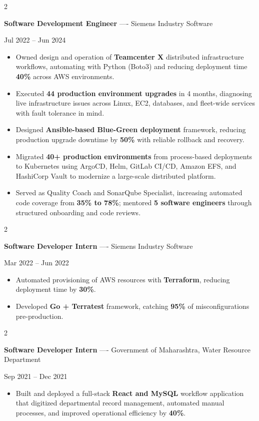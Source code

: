 \documentclass[10pt, letterpaper]{article}
\newenvironment{highlights}{
    \begin{itemize}[
        topsep=0.10 cm,
        parsep=0.06 cm,
        partopsep=0pt,
        itemsep=0.06 cm,
        leftmargin=12pt
    ]
}{
    \end{itemize}
}
\newenvironment{twocolentry}[2][]{
    \onecolentry
    \def\secondColumn{#2}
    \setcolumnwidth{\fill, 4.5 cm}
    \begin{paracol}{2}
}{
    \switchcolumn \raggedleft \secondColumn
    \end{paracol}
    \endonecolentry
}
\begin{document}
\vspace{0.15 cm}

\begin{twocolentry}{Jul 2022 -- Jun 2024}
\textbf{Software Development Engineer} ---- Siemens Industry Software
\end{twocolentry}
\begin{highlights}
  \item Owned design and operation of \textbf{Teamcenter X} distributed infrastructure workflows, automating with Python (Boto3) and reducing deployment time \textbf{40\%} across AWS environments.
  \item Executed \textbf{44 production environment upgrades} in 4 months, diagnosing live infrastructure issues across Linux, EC2, databases, and fleet-wide services with fault tolerance in mind.
  \item Designed \textbf{Ansible-based Blue-Green deployment} framework, reducing production upgrade downtime by \textbf{50\%} with reliable rollback and recovery.
  \item Migrated \textbf{40+ production environments} from process-based deployments to Kubernetes using ArgoCD, Helm, GitLab CI/CD, Amazon EFS, and HashiCorp Vault to modernize a large-scale distributed platform.
  \item Served as Quality Coach and SonarQube Specialist, increasing automated code coverage from \textbf{35\% to 78\%}; mentored \textbf{5 software engineers} through structured onboarding and code reviews.
\end{highlights}

\vspace{0.15 cm}

\begin{twocolentry}{Mar 2022 -- Jun 2022}
\textbf{Software Developer Intern} ---- Siemens Industry Software
\end{twocolentry}
\begin{highlights}
  \item Automated provisioning of AWS resources with \textbf{Terraform}, reducing deployment time by \textbf{30\%}.
  \item Developed \textbf{Go + Terratest} framework, catching \textbf{95\%} of misconfigurations pre-production.
\end{highlights}

\vspace{0.15 cm}

\begin{twocolentry}{Sep 2021 -- Dec 2021}
\textbf{Software Developer Intern} ---- Government of Maharashtra, Water Resource Department
\end{twocolentry}
\begin{highlights}
  \item Built and deployed a full-stack \textbf{React and MySQL} workflow application that digitized departmental record management, automated manual processes, and improved operational efficiency by \textbf{40\%}.
\end{highlights}
\end{document}
